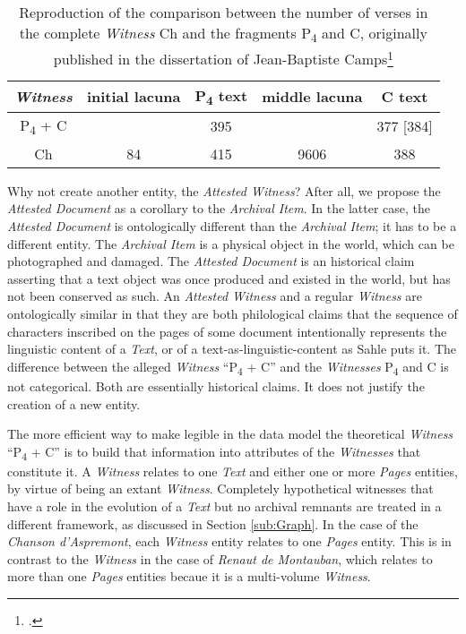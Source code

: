 \begin{table}[ht]
    \begin{center}
    \begin{tabular}{c||cccc}
        \textit{Witness} & initial lacuna & P\textsubscript{4} text & middle lacuna & C text \\
        \hline
        \hline
        P\textsubscript{4} + C & & 395 & & 377 [384] \\
        Ch & 84 & 415 & 9606 & 388
    \end{tabular}
    \end{center}
\caption{Reproduction of the comparison between the number of verses in the complete \textit{Witness} Ch and the fragments P\textsubscript{4} and C, originally published in the dissertation of Jean-Baptiste Camps\footcite[Table 1.3.][xcvii]{camps2016}}
\label{tab:CampsAspremont}
\end{table}

Why not create another entity, the \textit{Attested Witness}?\footnotemark{} After all, we propose the \textit{Attested Document} as a corollary to the \textit{Archival Item}. In the latter case, the \textit{Attested Document} is ontologically different than the \textit{Archival Item}; it has to be a different entity. The \textit{Archival Item} is a physical object in the world, which can be photographed and damaged. The \textit{Attested Document} is an historical claim asserting that a text object was once produced and existed in the world, but has not been conserved as such. An \textit{Attested Witness} and a regular \textit{Witness} are ontologically similar in that they are both philological claims that the sequence of characters inscribed on the pages of some document intentionally represents the linguistic content of a \textit{Text}, or of a text-as-linguistic-content as Sahle puts it. The difference between the alleged \textit{Witness} ``P\textsubscript{4} + C'' and the \textit{Witnesses} P\textsubscript{4} and C is not categorical. Both are essentially historical claims. It does not justify the creation of a new entity.

The more efficient way to make legible in the data model the theoretical \textit{Witness} ``P\textsubscript{4} + C'' is to build that information into attributes of the \textit{Witnesses} that constitute it. A \textit{Witness} relates to one \textit{Text} and either one or more \textit{Pages} entities, by virtue of being an extant \textit{Witness}. Completely hypothetical witnesses that have a role in the evolution of a \textit{Text} but no archival remnants are treated in a different framework, as discussed in Section \ref{sub:Graph}. In the case of the \textit{Chanson d'Aspremont}, each \textit{Witness} entity relates to one \textit{Pages} entity. This is in contrast to the \textit{Witness} in the case of \textit{Renaut de Montauban}, which relates to more than one \textit{Pages} entities becaue it is a multi-volume \textit{Witness}.

